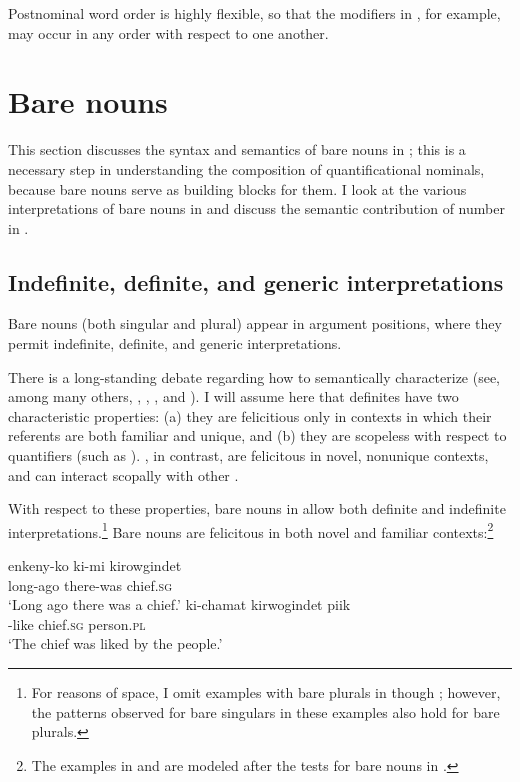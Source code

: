 \documentclass[output=paper]{LSP/langsci}
\begin{document}
\noindent Postnominal word order is highly flexible, so that the modifiers in , for example, may occur in any order with respect to one another.

\section{Bare nouns} 
\label{sec:landman:barenouns}

This section discusses the syntax and semantics of bare nouns in ; this is a necessary step in understanding the composition of quantificational nominals, because bare nouns serve as building blocks for them. I look at the various interpretations of bare nouns in  and discuss the semantic contribution of number in . 

\subsection{Indefinite, definite, and generic interpretations}
\label{sec:landman:barenounsinterpretations}
Bare nouns (both singular and plural) appear in argument positions, where they permit indefinite, definite, and generic interpretations.

There is a long-standing debate regarding how to semantically characterize  (see, among many others, \citealt{Frege:1892}, \citealt{Russell:1905}, \citealt{Heim:1982}, and \citealt{schwarz:2009}). I will assume here that definites have two characteristic properties: (a) they are felicitious only in contexts in which their referents are both familiar and unique, and (b) they are scopeless with respect to quantifiers (such as ). , in contrast, are felicitous in novel, nonunique contexts, and can interact scopally with other .

With respect to these properties, bare nouns in  allow both definite and indefinite interpretations.\footnote{For reasons of space, I omit examples with bare plurals in  though ; however, the patterns observed for bare singulars in these examples also hold for bare plurals.} Bare nouns are felicitous in both novel and familiar contexts:\footnote{The examples in  and  are modeled after the tests for bare nouns in \citet{Gillon:2015}.}

\ea \label{ex:landman:novelunique} 
  \settowidth {}  
  \ea \label{ex:landman:novel}
     \gll enkeny-ko ki-mi kirowgindet\\
          long-ago there-was chief.\textsc{sg}\\ 
     \glt ‘Long ago there was a chief.’
  \ex \label{ex:landman:familiar}
     \gll ki-chamat kirwogindet piik\\
          \pass-like chief.\textsc{sg} person.\textsc{pl}\\ 
     \glt ‘The chief was liked by the people.’
  \z
\z 
\end{document}
